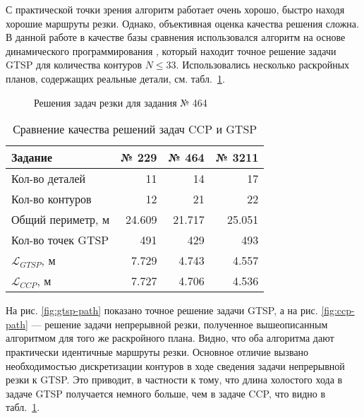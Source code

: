 С практической точки зрения
алгоритм работает очень хорошо,
быстро находя хорошие маршруты резки.
Однако, объективная оценка качества решения сложна.
В данной работе в качестве базы сравнения использовался алгоритм
на основе динамического программирования
\autocite{bi:RoMa},
который находит точное решение задачи GTSP
для количества контуров
$N \leqslant 33$.
Использовались несколько раскройных планов,
содержащих реальные детали,
см. табл.~\ref{tab:ccp-vs-gtsp}.

\begin{figure}
  \centering
  \caption{Решения задач резки для задания № 464}
  \label{fig:solutions-path}
\end{figure}

\begin{table}
  \centering
  \caption{Сравнение качества решений задач CCP и GTSP}
  \label{tab:ccp-vs-gtsp}
  \def\arraystretch{1.2}
  \begin{tabular}{l|*{3}{r}}
      Задание & № 229 & № 464 & № 3211 \\
      \hline
      Кол-во деталей & 11 & 14 & 17\\
      Кол-во контуров & 12 & 21 & 22 \\
      Общий периметр, м & 24.609 & 21.717 & 25.051 \\
      Кол-во точек GTSP & 491 & 429 & 493 \\
      $\mathcal L_{GTSP}$, м & 7.729 & 4.743 & 4.557 \\
      $\mathcal L_{CCP}$, м & 7.727 & 4.706 & 4.536 \\
      \hline
  \end{tabular}
\end{table}

На рис. \ref{fig:gtsp-path}
показано точное решение задачи GTSP,
а на рис. \ref{fig:ccp-path}
--- решение задачи непрерывной резки,
полученное вышеописанным алгоритмом
для того же раскройного плана.
Видно,
что оба алгоритма дают практически идентичные
маршруты резки.
Основное отличие вызвано необходимостью дискретизации
контуров в ходе сведения задачи
непрерывной резки к GTSP.
Это приводит, в частности к тому,
что длина холостого хода в задаче GTSP
получается немного больше,
чем в задаче CCP,
что видно в табл.~\ref{tab:ccp-vs-gtsp}.
